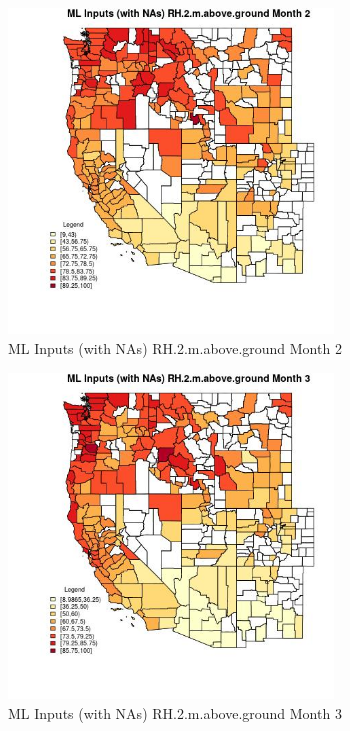 \begin{figure} 
\centering  
\includegraphics[width=0.77\textwidth]{Code_Outputs/Report_ML_input_PM25_Step4_part_f_de_duplicated_aves_prioritize_24hr_obswNAs_CountyRH2mabovegroundmedianMonth2.jpg} 
\caption{\label{fig:Report_ML_input_PM25_Step4_part_f_de_duplicated_aves_prioritize_24hr_obswNAsCountyRH2mabovegroundmedianMonth2}ML Inputs (with NAs) RH.2.m.above.ground Month 2} 
\end{figure} 
 

\clearpage 

\begin{figure} 
\centering  
\includegraphics[width=0.77\textwidth]{Code_Outputs/Report_ML_input_PM25_Step4_part_f_de_duplicated_aves_prioritize_24hr_obswNAs_CountyRH2mabovegroundmedianMonth3.jpg} 
\caption{\label{fig:Report_ML_input_PM25_Step4_part_f_de_duplicated_aves_prioritize_24hr_obswNAsCountyRH2mabovegroundmedianMonth3}ML Inputs (with NAs) RH.2.m.above.ground Month 3} 
\end{figure} 
 

